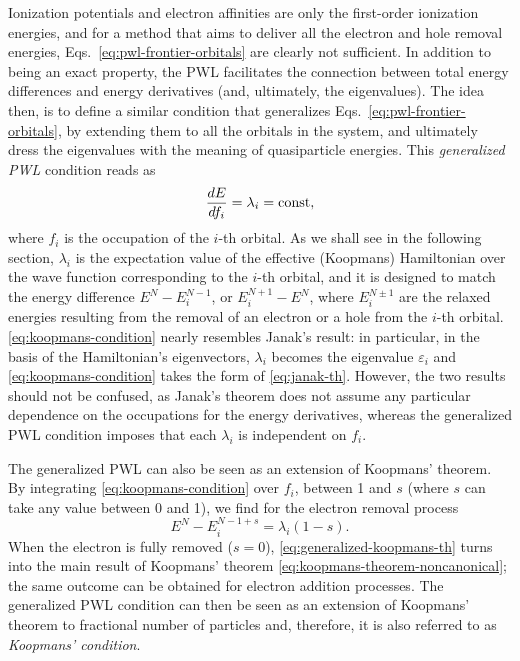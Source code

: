 Ionization potentials and electron affinities are only the first-order ionization energies, and for a method that aims to deliver all the electron and hole removal energies, Eqs.~\eqref{eq:pwl-frontier-orbitals} are clearly not sufficient. In addition to being an exact property, the PWL facilitates the connection between total energy differences and energy derivatives (and, ultimately, the eigenvalues). The idea then, is to define a similar condition that generalizes Eqs.~\eqref{eq:pwl-frontier-orbitals}, by extending them to all the orbitals in the system, and ultimately dress the eigenvalues with the meaning of quasiparticle energies. This \emph{generalized PWL} \cite{dabo_non-koopmans_2009,dabo_koopmans_2010} condition reads as
%
\begin{equation}
    \frac{dE}{df_i} = \lambda_i = {\rm const} ,
    \label{eq:koopmans-condition}
\end{equation}
%
where $f_i$ is the occupation of the $i$-th orbital. As we shall see in the following section, $\lambda_i$ is the expectation value of the effective (Koopmans) Hamiltonian over the wave function corresponding to the $i$-th orbital, and it is designed to match the energy difference $E^N - E^{N-1}_i$, or $E^{N+1}_i - E^N$, where $E^{N \pm 1}_i$ are the relaxed energies resulting from the removal of an electron or a hole from the $i$-th orbital. \cref{eq:koopmans-condition} nearly resembles Janak's result: in particular, in the basis of the Hamiltonian's eigenvectors, $\lambda_i$ becomes the eigenvalue $\varepsilon_i$ and \cref{eq:koopmans-condition} takes the form of \cref{eq:janak-th}. However, the two results should not be confused, as Janak's theorem does not assume any particular dependence on the occupations for the energy derivatives, whereas the generalized PWL condition imposes that each $\lambda_i$ is independent on $f_i$.

The generalized PWL can also be seen as an extension of Koopmans' theorem. By integrating \cref{eq:koopmans-condition} over $f_i$, between 1 and $s$ (where $s$ can take any value between 0 and 1), we find for the electron removal process
%
\begin{equation}
    E^N - E^{N-1+s}_i = \lambda_i (1-s) .
    \label{eq:generalized-koopmans-th}
\end{equation}
%
When the electron is fully removed ($s=0$), \cref{eq:generalized-koopmans-th} turns into the main result of Koopmans' theorem \eqref{eq:koopmans-theorem-noncanonical}; the same outcome can be obtained for electron addition processes. The generalized PWL condition can then be seen as an extension of Koopmans' theorem to fractional number of particles and, therefore, it is also referred to as \emph{Koopmans' condition}.

